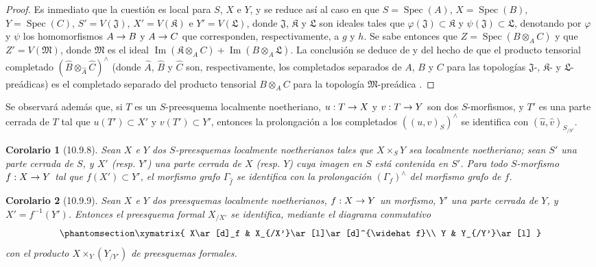 \documentclass[oneside]{amsart}
\theoremstyle{ega-env-style}
\theoremstyle{ega-thm-env-style}
\newtheorem*{corollary}{Corolario}
\theoremstyle{ega-defn-env-style}
\renewcommand{\to}{\mathchoice{\longrightarrow}{\rightarrow}{\rightarrow}{\rightarrow}}
\let\EGAOriginalLabel\label
\renewcommand{\label}[1]{\phantomsection\EGAOriginalLabel{#1}}
\begin{document}
\begin{proof}
Es inmediato que la cuestión es local para $S$, $X$ e $Y$, y se reduce así al caso en que $S=\operatorname{Spec}(A)$, $X=\operatorname{Spec}(B)$, $Y=\operatorname{Spec}(C)$, $S'=V(\mathfrak{J})$, $X'=V(\mathfrak{K})$ e $Y'=V(\mathfrak{L})$, donde $\mathfrak{J}$, $\mathfrak{K}$ y $\mathfrak{L}$ son ideales tales que $\varphi(\mathfrak{J})\subset\mathfrak{K}$ y $\psi(\mathfrak{J})\subset\mathfrak{L}$, denotando por $\varphi$ y $\psi$ los homomorfismos $A\to B$ y $A\to C$ que corresponden, respectivamente, a $g$ y $h$.
Se sabe entonces que $Z=\operatorname{Spec}(B\otimes_A C)$ y que $Z'=V(\mathfrak{M})$, donde $\mathfrak{M}$ es el ideal $\operatorname{Im}(\mathfrak{K}\otimes_A C)
+\operatorname{Im}(B\otimes_A\mathfrak{L})$.
La conclusión se deduce de  y del hecho de que el producto tensorial completado $(\widehat B\otimes_{\widehat A}\widehat C)^\wedge$ (donde $\widehat A$, $\widehat B$ y $\widehat C$ son, respectivamente, los completados separados de $A$, $B$ y $C$ para las topologías $\mathfrak{J}$-, $\mathfrak{K}$- y $\mathfrak{L}$-preádicas) es el completado separado del producto tensorial $B\otimes_A C$ para la topología $\mathfrak{M}$-preádica .
\end{proof}

Se observará además que, si $T$ es un $S$-preesquema localmente noetheriano, $u:T\to X$ y $v:T\to Y$ son dos $S$-morfismos, y $T'$ es una parte cerrada de $T$ tal que $u(T')\subset X'$ y $v(T')\subset Y'$, entonces la prolongación a los completados $((u,v)_S)^\wedge$ se identifica con $(\widehat u,\widehat v)_{S_{/S'}}$.

\begin{corollary}[10.9.8]
\label{I.10.9.8}
Sean $X$ e $Y$ dos $S$-preesquemas localmente noetherianos tales que $X\times_S Y$ sea localmente noetheriano; sean $S'$ una parte cerrada de $S$, y $X'$ \textup{(resp. $Y'$)} una parte cerrada de $X$ \textup{(resp. $Y$)} cuya imagen en $S$ está contenida en $S'$.
Para todo $S$-morfismo $f:X\to Y$ tal que $f(X')\subset Y'$, el morfismo grafo $\Gamma_{\widehat f}$ se identifica con la prolongación $(\Gamma_f)^\wedge$ del morfismo grafo de $f$.
\end{corollary}

\begin{corollary}[10.9.9]
\label{I.10.9.9}
Sean $X$ e $Y$ dos preesquemas localmente noetherianos, $f:X\to Y$ un morfismo, $Y'$ una parte cerrada de $Y$, y $X'=f^{-1}(Y')$.
Entonces el preesquema formal $X_{/X'}$ se identifica, mediante el diagrama conmutativo
\[
  \label{I.10.9.9.1-fr}
  \xymatrix{
    X\ar[d]_f &
    X_{/X'}\ar[l]\ar[d]^{\widehat f}\\
    Y &
    Y_{/Y'}\ar[l]
  }
\]
con el producto $X\times_Y(Y_{/Y'})$ de preesquemas formales.
\end{corollary}
\end{document}

